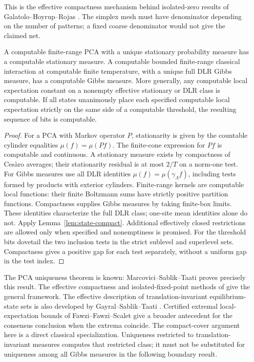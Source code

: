 This is the effective compactness mechanism behind isolated-zero
results of Galatolo--Hoyrup--Rojas
\cite[Theorem~2.9 and Corollary~3]{invariantComputability}.
The simplex mesh must have denominator depending on the number of
patterns; a fixed coarse denominator would not give the claimed net.

\begin{theorem}\label{thm:unique-states}
A computable finite-range PCA with a unique stationary probability
measure has a computable stationary measure. A computable bounded
finite-range classical interaction at computable finite temperature,
with a unique full DLR Gibbs measure, has a computable Gibbs measure.
More generally, any computable local expectation constant on a
nonempty effective stationary or DLR class is computable. If all
states unanimously place each specified computable local expectation
strictly on the same side of a computable threshold, the resulting
sequence of bits is computable.
\end{theorem}
\begin{proof}
For a PCA with Markov operator $P$, stationarity is given by the
countable cylinder equalities $\mu(f)=\mu(Pf)$. The finite-cone
expression for $Pf$ is computable and continuous. A stationary
measure exists by compactness of Ces\`aro averages; their stationarity
residual is at most $2/T$ on a norm-one test.
For Gibbs measures use all DLR identities
$\mu(f)=\mu(\gamma_\Lambda f)$, including tests formed by products
with exterior cylinders. Finite-range kernels are computable local
functions: their finite Boltzmann sums have strictly positive
partition functions. Compactness supplies Gibbs measures by taking
finite-box limits. These identities characterize the full DLR class;
one-site mean identities alone do not. Apply
Lemma~\ref{lem:state-compact}. Additional effectively closed
restrictions are allowed only when specified and nonemptiness is
promised. For the threshold bits dovetail the two inclusion tests
in the strict sublevel and superlevel sets. Compactness gives a
positive gap for each test separately, without a uniform gap in the
test index.
\end{proof}

The PCA uniqueness theorem is known: Marcovici--Sablik--Taati
\cite[Proposition~2.2]{noisyErgodicity} proves precisely this result.
The effective compactness and isolated-fixed-point methods of
\cite{invariantComputability} give the general framework. The
effective description of translation-invariant equilibrium-state
sets is also developed by Gayral--Sablik--Taati \cite{effectiveStateSets}.
Certified extremal local-expectation bounds of Fawzi--Fawzi--Scalet
\cite{certifiedStates} give a broader antecedent for the consensus
conclusion when the extrema coincide. The compact-cover argument
here is a direct classical specialization. Uniqueness restricted to translation-invariant measures
computes that restricted class; it must not be substituted for
uniqueness among all Gibbs measures in the following boundary result.

